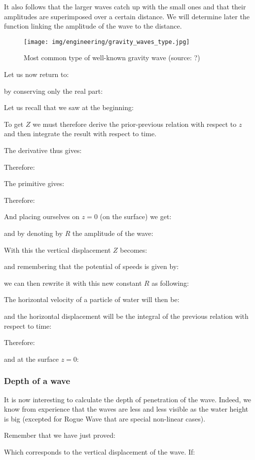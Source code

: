 	It also follows that the larger waves catch up with the small ones and that their amplitudes are superimposed over a certain distance. We will determine later the function linking the amplitude of the wave to the distance.
	\begin{figure}[H]
		\centering
		\texttt{[image: img/engineering/gravity\_waves\_type.jpg]}	
		\caption{Most common type of well-known gravity wave (source: ?)}
	\end{figure}
	Let us now return to:
	
	by conserving only the real part:
	
	Let us recall that we saw at the beginning:
	
	To get $Z$ we must therefore derive the prior-previous relation with respect to $z$ and then integrate the result with respect to time.

	The derivative thus gives:
	
	Therefore:
	
	The primitive gives:
	
	Therefore:
	
	And placing ourselves on $z=0$ (on the surface) we get:
	
	and by denoting by $R$ the amplitude of the wave:
	
	With this the vertical displacement $Z$ becomes:
	
	and remembering that the potential of speeds is given by:
	
	we can then rewrite it with this new constant $R$ as following:
	
	The horizontal velocity of a particle of water will then be:
	
	and the horizontal displacement will be the integral of the previous relation with respect to time:
	
	Therefore:
	
	and at the surface $z=0$:
	
	
	\subsubsection{Depth of a wave}
	It is now interesting to calculate the depth of penetration of the wave. Indeed, we know from experience that the waves are less and less visible as the water height is big (excepted for Rogue Wave that are special non-linear cases).

	Remember that we have just proved:
	
	Which corresponds to the vertical displacement of the wave. If:
	
